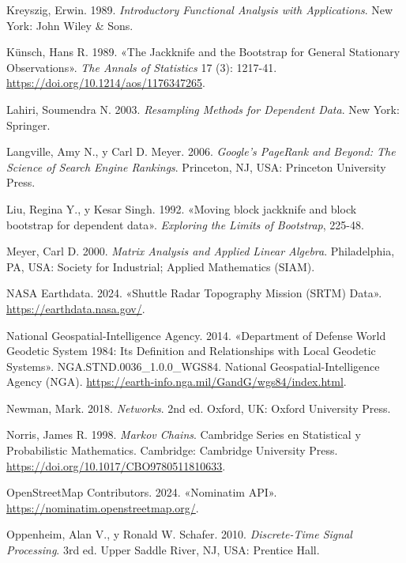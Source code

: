 \documentclass[
  spanish,
  us-letterpaper,
]{scrreprt}
\newlength{\cslhangindent}
\newenvironment{CSLReferences}[2] %
 {\begin{list}{}{%
  \setlength{\itemindent}{0pt}
  \setlength{\leftmargin}{0pt}
  \setlength{\parsep}{0pt}
  \ifodd #1
   \setlength{\leftmargin}{\cslhangindent}
   \setlength{\itemindent}{-1\cslhangindent}
  \fi
  \setlength{\itemsep}{#2\baselineskip}}}
 {\end{list}}
\numberwithin{equation}{section}
\begin{document}
\begin{CSLReferences}{1}{0}
Kreyszig, Erwin. 1989. \emph{Introductory Functional Analysis with
Applications}. New York: John Wiley \& Sons.

Künsch, Hans R. 1989. {«The Jackknife and the Bootstrap for General
Stationary Observations»}. \emph{The Annals of Statistics} 17 (3):
1217-41. \url{https://doi.org/10.1214/aos/1176347265}.

Lahiri, Soumendra N. 2003. \emph{Resampling Methods for Dependent Data}.
New York: Springer.

Langville, Amy N., y Carl D. Meyer. 2006. \emph{Google's PageRank and
Beyond: The Science of Search Engine Rankings}. Princeton, NJ, USA:
Princeton University Press.

Liu, Regina Y., y Kesar Singh. 1992. {«Moving block jackknife and block
bootstrap for dependent data»}. \emph{Exploring the Limits of
Bootstrap}, 225-48.

Meyer, Carl D. 2000. \emph{Matrix Analysis and Applied Linear Algebra}.
Philadelphia, PA, USA: Society for Industrial; Applied Mathematics
(SIAM).

NASA Earthdata. 2024. {«Shuttle Radar Topography Mission (SRTM) Data»}.
\url{https://earthdata.nasa.gov/}.

National Geospatial-Intelligence Agency. 2014. {«Department of Defense
World Geodetic System 1984: Its Definition and Relationships with Local
Geodetic Systems»}. NGA.STND.0036\_1.0.0\_WGS84. National
Geospatial-Intelligence Agency (NGA).
\url{https://earth-info.nga.mil/GandG/wgs84/index.html}.

Newman, Mark. 2018. \emph{Networks}. 2nd ed. Oxford, UK: Oxford
University Press.

Norris, James R. 1998. \emph{Markov Chains}. Cambridge Series en
Statistical y Probabilistic Mathematics. Cambridge: Cambridge University
Press. \url{https://doi.org/10.1017/CBO9780511810633}.

OpenStreetMap Contributors. 2024. {«Nominatim API»}.
\url{https://nominatim.openstreetmap.org/}.

Oppenheim, Alan V., y Ronald W. Schafer. 2010. \emph{Discrete-Time
Signal Processing}. 3rd ed. Upper Saddle River, NJ, USA: Prentice Hall.


\end{CSLReferences}
\end{document}
